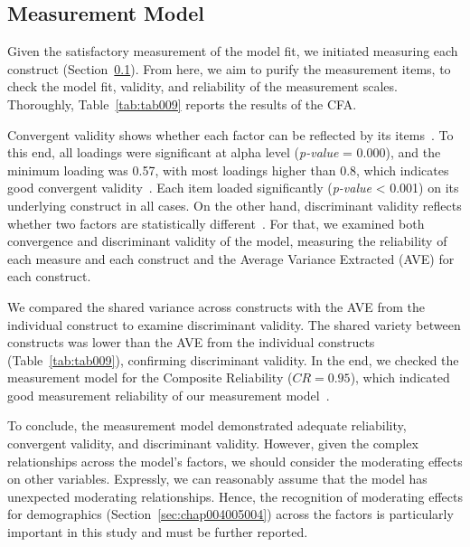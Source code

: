 \subsection{Measurement Model}
\label{sec:chap004005002}

Given the satisfactory measurement of the model fit, we initiated measuring each construct (Section~\ref{sec:chap004005002}).
From here, we aim to purify the measurement items, to check the model fit, validity, and reliability of the measurement scales.
Thoroughly, Table~\ref{tab:tab009} reports the results of the CFA.



Convergent validity shows whether each factor can be reflected by its items~\cite{10.3389/fpubh.2018.00149, Henseler2015}.
To this end, all loadings were significant at alpha level ({\it p-value} = 0.000), and the minimum loading was 0.57, with most loadings higher than 0.8, which indicates good convergent validity~\cite{info:doi/10.2196/14316}.
Each item loaded significantly ({\it p-value} < 0.001) on its underlying construct in all cases.
On the other hand, discriminant validity reflects whether two factors are statistically different~\cite{10.3389/fpubh.2018.00149, Henseler2015}.
For that, we examined both convergence and discriminant validity of the model, measuring the reliability of each measure and each construct and the Average Variance Extracted (AVE) for each construct.

We compared the shared variance across constructs with the AVE from the individual construct to examine discriminant validity.
The shared variety between constructs was lower than the AVE from the individual constructs (Table~\ref{tab:tab009}), confirming discriminant validity.
In the end, we checked the measurement model for the Composite Reliability ($CR = 0.95$), which indicated good measurement reliability of our measurement model~\cite{Bagozzi2012, doi:10.1504/IJMDA.2017.087624, murtagh2012multivariate, SUMAK2016602}.

To conclude, the measurement model demonstrated adequate reliability, convergent validity, and discriminant validity.
However, given the complex relationships across the model's factors, we should consider the moderating effects on other variables.
Expressly, we can reasonably assume that the model has unexpected moderating relationships.
Hence, the recognition of moderating effects for demographics (Section~\ref{sec:chap004005004}) across the factors is particularly important in this study and must be further reported.

